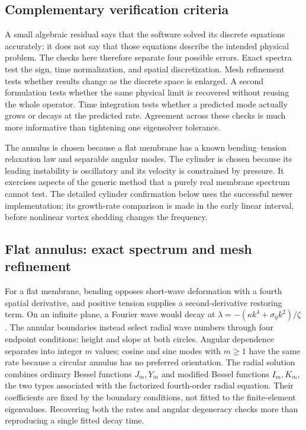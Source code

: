 \subsection{Complementary verification criteria}
A small algebraic residual says that the software solved its discrete equations accurately; it does not say that those equations describe the intended physical problem. The checks here therefore separate four possible errors. Exact spectra test the sign, time normalization, and spatial discretization. Mesh refinement tests whether results change as the discrete space is enlarged. A second formulation tests whether the same physical limit is recovered without reusing the whole operator. Time integration tests whether a predicted mode actually grows or decays at the predicted rate. Agreement across these checks is much more informative than tightening one eigensolver tolerance.

The annulus is chosen because a flat membrane has a known bending--tension relaxation law and separable angular modes. The cylinder is chosen because its leading instability is oscillatory and its velocity is constrained by pressure. It exercises aspects of the generic method that a purely real membrane spectrum cannot test. The detailed cylinder confirmation below uses the successful newer implementation; its growth-rate comparison is made in the early linear interval, before nonlinear vortex shedding changes the frequency.


\subsection{Flat annulus: exact spectrum and mesh refinement}


For a flat membrane, bending opposes short-wave deformation with a fourth spatial derivative, and positive tension supplies a second-derivative restoring term. On an infinite plane, a Fourier wave would decay at $\lambda=-(\kappa k^4+\sigma_0k^2)/\zeta$. The annular boundaries instead select radial wave numbers through four endpoint conditions: height and slope at both circles. Angular dependence separates into integer $m$ values; cosine and sine modes with $m\ge1$ have the same rate because a circular annulus has no preferred orientation. The radial solution combines ordinary Bessel functions $J_m,Y_m$ and modified Bessel functions $I_m,K_m$, the two types associated with the factorized fourth-order radial equation. Their coefficients are fixed by the boundary conditions, not fitted to the finite-element eigenvalues. Recovering both the rates and angular degeneracy checks more than reproducing a single fitted decay time.



